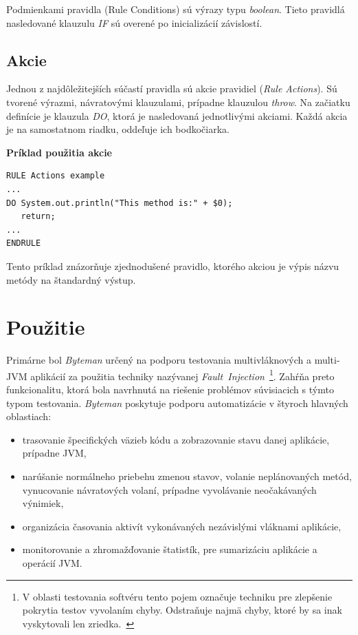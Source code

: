 \documentclass[11pt,final,oneside]{fithesis}
\newenvironment{example}[1]
{
\vspace{3mm}
\noindent\textbf{#1}
\vspace{2mm}
}
{
\vspace{3mm}
}
\begin{document}
Podmienkami pravidla (Rule Conditions) sú výrazy typu \textit{boolean}.
Tieto pravidlá nasledované klauzulu \textit{IF} sú overené po inicializácií závislostí.

\subsection{Akcie}
Jednou z najdôležitejších súčastí pravidla sú akcie pravidiel (\textit{Rule 
Actions}). Sú tvorené výrazmi, návratovými klauzulami, prípadne klauzulou
\textit{throw}. Na začiatku definície je klauzula \textit{DO}, ktorá je 
nasledovaná jednotlivými akciami. Každá akcia je na samostatnom riadku, 
oddeľuje ich bodkočiarka.

\begin{example}{Príklad použitia akcie}
\begin{verbatim}
RULE Actions example
...
DO System.out.println("This method is:" + $0);
   return;
...
ENDRULE
\end{verbatim}
\end{example}

Tento príklad znázorňuje zjednodušené pravidlo, ktorého akciou je výpis názvu 
metódy na štandardný výstup. 

\section{Použitie}
Primárne bol \textit{Byteman} určený na podporu testovania multivláknových a
multi-JVM aplikácií za použitia techniky nazývanej
\textit{Fault~Injection}~\footnote{V oblasti testovania softvéru tento pojem 
označuje techniku pre zlepšenie pokrytia testov vyvolaním chyby. Odstraňuje 
najmä chyby, ktoré by sa inak vyskytovali len
zriedka.~\cite{Roebuck:2011:STH:2031364}}. Zahŕňa preto 
funkcionalitu, ktorá bola navrhnutá na riešenie problémov súvisiacich s týmto 
typom testovania. \textit{Byteman} poskytuje podporu automatizácie v 
štyroch hlavných 
oblastiach:

\begin{itemize}
\item trasovanie špecifických väzieb kódu a zobrazovanie stavu danej
aplikácie, prípadne JVM,
\item narúšanie normálneho priebehu zmenou stavov, volanie neplánovaných
metód, vynucovanie návratových volaní, prípadne vyvolávanie neočakávaných 
výnimiek,
\item organizácia časovania aktivít vykonávaných nezávislými vláknami 
aplikácie,
\item monitorovanie a zhromažďovanie štatistík, pre sumarizáciu aplikácie a
operácií JVM.
\end{itemize}
\end{document}
